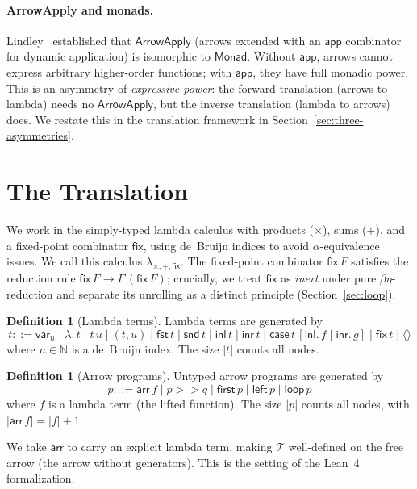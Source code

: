 \documentclass[11pt,a4paper]{article}
\theoremstyle{definition}
\newtheorem{definition}[theorem]{Definition}
\theoremstyle{remark}
\newcommand{\arr}{\mathsf{arr}}
\newcommand{\comp}{\mathbin{>\!\!>}}
\newcommand{\first}{\mathsf{first}}
\newcommand{\leftc}{\mathsf{left}}
\newcommand{\loopop}{\mathsf{loop}}
\newcommand{\app}{\mathsf{app}}
\newcommand{\ArrowApply}{\mathsf{ArrowApply}}
\newcommand{\fix}{\mathsf{fix}}
\newcommand{\T}{\mathcal{T}}
\newcommand{\stlc}{\lambda_{\times,+,\fix}}
\newcommand{\size}[1]{\lvert #1 \rvert}
\begin{document}
\paragraph{ArrowApply and monads.}
Lindley~\cite{lindley2010embedding} established that $\ArrowApply$ (arrows
extended with an $\app$ combinator for dynamic application) is isomorphic
to $\mathsf{Monad}$. Without $\app$, arrows cannot express arbitrary
higher-order functions; with $\app$, they have full monadic power. This is
an asymmetry of \emph{expressive power}: the forward translation (arrows to
lambda) needs no $\ArrowApply$, but the inverse translation (lambda to
arrows) does. We restate this in the translation framework in
Section~\ref{sec:three-asymmetries}.

\section{The Translation}\label{sec:translation}

We work in the simply-typed lambda calculus with products ($\times$), sums
($+$), and a fixed-point combinator $\fix$, using de~Bruijn indices to
avoid $\alpha$-equivalence issues. We call this calculus $\stlc$. The
fixed-point combinator $\fix\,F$ satisfies the reduction rule
$\fix\,F \to F\,(\fix\,F)$; crucially, we treat $\fix$ as \emph{inert}
under pure $\beta\eta$-reduction and separate its unrolling as a distinct
principle (Section~\ref{sec:loop}).

\begin{definition}[Lambda terms]\label{def:lamterm}
Lambda terms are generated by
\[
  t ::= \mathsf{var}_n \mid \lambda.\, t \mid t\,u \mid (t, u)
  \mid \mathsf{fst}\,t \mid \mathsf{snd}\,t \mid \mathsf{inl}\,t
  \mid \mathsf{inr}\,t \mid \mathsf{case}\,t\,[\mathsf{inl}.\,f \mid \mathsf{inr}.\,g]
  \mid \fix\,t \mid \langle\rangle
\]
where $n \in \mathbb{N}$ is a de~Bruijn index. The size $\size{t}$ counts
all nodes.
\end{definition}

\begin{definition}[Arrow programs]\label{def:arrowprog}
Untyped arrow programs are generated by
\[
  p ::= \arr\,f \mid p \comp q \mid \first\,p \mid \leftc\,p \mid \loopop\,p
\]
where $f$ is a lambda term (the lifted function). The size $\size{p}$
counts all nodes, with $\size{\arr\,f} = \size{f} + 1$.
\end{definition}

We take $\arr$ to carry an explicit lambda term, making $\T$ well-defined
on the free arrow (the arrow without generators). This is the setting of
the Lean~4 formalization.
\end{document}
